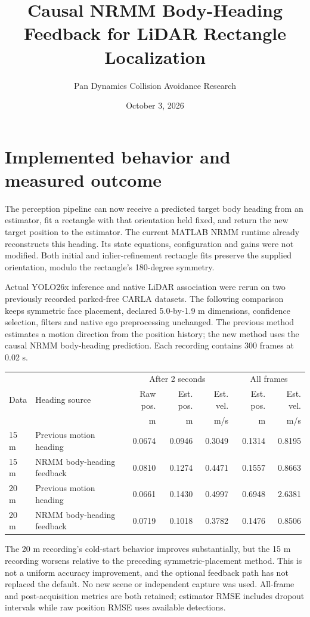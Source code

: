 \documentclass[11pt]{article}
\title{Causal NRMM Body-Heading Feedback for LiDAR Rectangle Localization}
\author{Pan Dynamics Collision Avoidance Research}
\date{October 3, 2026}
\begin{document}
\maketitle
\section{Implemented behavior and measured outcome}
The perception pipeline can now receive a predicted target body heading from
an estimator, fit a rectangle with that orientation held fixed, and return the
new target position to the estimator. The current MATLAB NRMM runtime already
reconstructs this heading. Its state equations, configuration and gains were
not modified. Both initial and inlier-refinement rectangle fits preserve the
supplied orientation, modulo the rectangle's 180-degree symmetry.

Actual YOLO26x inference and native LiDAR association were rerun on two
previously recorded parked-free CARLA datasets. The following comparison keeps
symmetric face placement, declared 5.0-by-1.9 m dimensions, confidence selection,
filters and native ego preprocessing unchanged. The previous method estimates
a motion direction from the position history; the new method uses the causal
NRMM body-heading prediction. Each recording contains 300 frames at 0.02 s.

\begin{center}\scriptsize
\begin{tabular}{@{}llrrrrr@{}}\toprule
 & & \multicolumn{3}{c}{After 2 seconds} & \multicolumn{2}{c}{All frames} \\
Data & Heading source & Raw pos. & Est. pos. & Est. vel. & Est. pos. & Est. vel. \\
 & & m & m & m/s & m & m/s \\\midrule
15 m & Previous motion heading & 0.0674 & 0.0946 & 0.3049 & 0.1314 & 0.8195 \\
15 m & NRMM body-heading feedback & 0.0810 & 0.1274 & 0.4471 & 0.1557 & 0.8663 \\
20 m & Previous motion heading & 0.0661 & 0.1430 & 0.4997 & 0.6948 & 2.6381 \\
20 m & NRMM body-heading feedback & 0.0719 & 0.1018 & 0.3782 & 0.1476 & 0.8506 \\
\bottomrule\end{tabular}\end{center}

The 20 m recording's cold-start behavior improves substantially, but the
15 m recording worsens relative to the preceding symmetric-placement method.
This is not a uniform accuracy improvement, and the optional feedback path
has not replaced the default. No new scene or independent capture was used.
All-frame and post-acquisition metrics are both retained; estimator RMSE
includes dropout intervals while raw position RMSE uses available detections.
\end{document}
